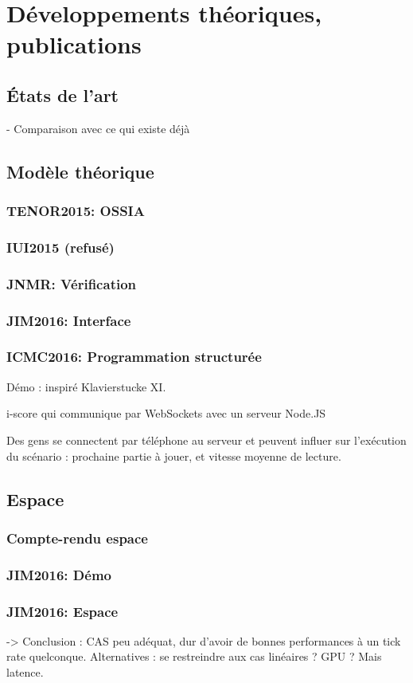 \documentclass[french,a4paper]{book}
\begin{document}
\section{Développements théoriques, publications}
\subsection{États de l'art}
- Comparaison avec ce qui existe déjà
\subsection{Modèle théorique}
\subsubsection{TENOR2015: OSSIA}
\subsubsection{IUI2015 (refusé)}
\subsubsection{JNMR: Vérification}
\subsubsection{JIM2016: Interface}
\subsubsection{ICMC2016: Programmation structurée}
Démo : inspiré Klavierstucke XI.

i-score qui communique par WebSockets avec un serveur Node.JS

Des gens se connectent par téléphone au serveur et peuvent influer sur 
l'exécution du scénario : prochaine partie à jouer, et vitesse moyenne de lecture.
\subsection{Espace}
\subsubsection{Compte-rendu espace}

\subsubsection{JIM2016: Démo}
\subsubsection{JIM2016: Espace}
-> Conclusion : CAS peu adéquat, dur d'avoir de bonnes performances à un tick rate quelconque.
Alternatives : se restreindre aux cas linéaires ? 
GPU ? Mais latence.
\end{document}

